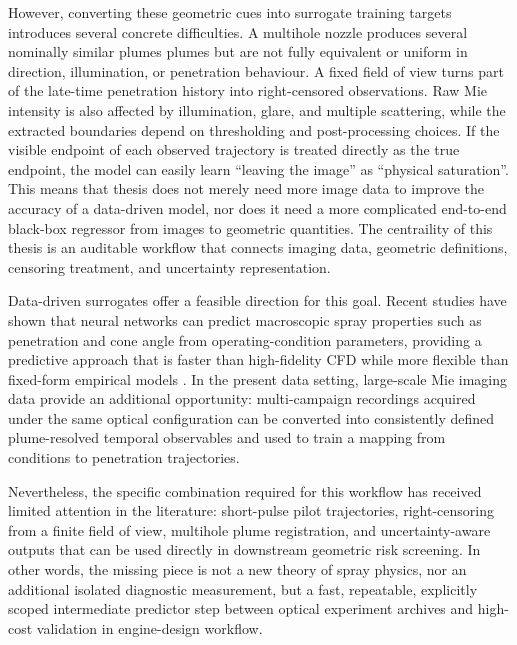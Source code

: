 However, converting these geometric cues into surrogate training targets introduces several concrete difficulties.
A multihole nozzle produces several nominally similar plumes plumes but are not fully equivalent or uniform in direction, illumination, or penetration behaviour.
A fixed field of view turns part of the late-time penetration history into right-censored observations.
Raw Mie intensity is also affected by illumination, glare, and multiple scattering, while the extracted boundaries depend on thresholding and post-processing choices.
If the visible endpoint of each observed trajectory is treated directly as the true endpoint, the model can easily learn ``leaving the image''
as ``physical saturation''.
This means that thesis does not merely need more image data to improve the accuracy of a data-driven model,
nor does it need a more complicated end-to-end black-box regressor from images to geometric quantities.
The centraility of this thesis is an auditable workflow that connects imaging data, geometric definitions, censoring treatment, and uncertainty representation.

Data-driven surrogates offer a feasible direction for this goal.
Recent studies have shown that neural networks can predict macroscopic spray properties such as penetration and cone angle
from operating-condition parameters,
providing a predictive approach that is faster than high-fidelity CFD while more flexible than fixed-form empirical models
\cite{VazKarathanasis2026,liu2020sprayreview}.
In the present data setting, large-scale Mie imaging data provide an additional opportunity:
multi-campaign recordings acquired under the same optical configuration can be converted into consistently defined plume-resolved temporal observables
and used to train a mapping from conditions to penetration trajectories.

Nevertheless, the specific combination required for this workflow has received limited attention in the literature:
short-pulse pilot trajectories, right-censoring from a finite field of view, multihole plume registration, and uncertainty-aware outputs
that can be used directly in downstream geometric risk screening.
In other words, the missing piece is not a new theory of spray physics,
nor an additional isolated diagnostic measurement, but a fast, repeatable, explicitly scoped intermediate predictor step
between optical experiment archives and high-cost validation in engine-design workflow.

